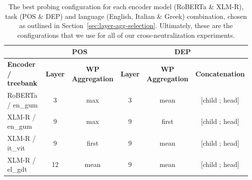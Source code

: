 \documentclass[11pt,a4paper]{article}
\begin{document}
\begin{table}[ht]
\centering
\begin{tabular}{@{}lccccc@{}}
\toprule
 & \multicolumn{2}{c}{\textbf{POS}} & \multicolumn{3}{c}{\textbf{DEP}} \\ \midrule
\textbf{Encoder / treebank} & \textbf{Layer} & \textbf{WP Aggregation} & \textbf{Layer} & \textbf{WP Aggregation} & \textbf{Concatenation} \\
RoBERTa / en\_gum & 3 & max & 3 & mean & {[}child ; head{]} \\
XLM-R / en\_gum & 9 & max & 9 & first & {[}child ; head{]} \\
XLM-R / it\_vit & 9 & first & 9 & mean & {[}child ; head{]} \\
XLM-R / el\_gdt & 12 & mean & 9 & mean & {[}child ; head{]} \\ \bottomrule
\end{tabular}
\caption{The best probing configuration for each encoder model (RoBERTa \& XLM-R), task (POS \& DEP) and language (English, Italian \& Greek) combination, chosen as outlined in Section~\ref{sec:layer-agg-selection}. Ultimately, these are the configurations that we use for all of our cross-neutralization experiments.}
\label{tab:configurations}
\end{table}
\end{document}
